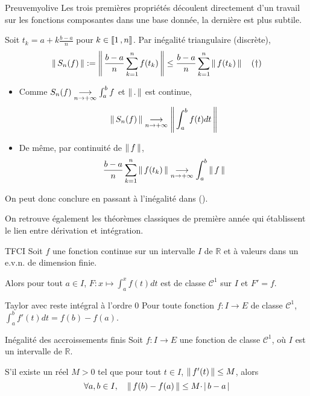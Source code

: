     \begin{demo}{Preuve}{myolive}
        Les trois premières propriétés découlent directement d’un travail sur les fonctions composantes dans une base donnée, la dernière est plus subtile. 

        Soit $t_k = a + k \frac{b-a}{n}$ pour $k \in \left\llbracket 1 \, , n \right\rrbracket$. Par inégalité triangulaire (discrète), 
        \[ \left\lVert \,S_n(f) \, \right\rVert := \left\lVert \,\frac{b-a}{n} \sum_{k=1}^{n} f(t_k) \, \right\rVert \leq \frac{b-a}{n} \sum_{k=1}^{n} \left\lVert \,f(t_k) \, \right\rVert \quad (\text{\textdagger})\]   
        \begin{itemize}
            \item Comme $S_n(f) \underset{n \rightarrow +\infty}{\longrightarrow} \int_{a}^{b} f$ et $\left\lVert \,. \, \right\rVert$ est continue, 
            \[ \left\lVert \,S_n(f) \, \right\rVert \underset{n \rightarrow +\infty}{\longrightarrow} \left\lVert \,\int_{a}^{b} f(t)dt \, \right\rVert \]   
            \item De même, par continuité de $\left\lVert \,f \, \right\rVert$, 
            \[ \frac{b-a}{n} \sum_{k=1}^{n} \left\lVert \,f(t_k) \, \right\rVert \underset{n \rightarrow +\infty}{\longrightarrow} \int_{a}^{b} \left\lVert \,f \, \right\rVert \]
        \end{itemize}
        On peut donc conclure en passant à l’inégalité dans (\textdagger).
    \end{demo}

    On retrouve également les théorèmes classiques de première année qui établissent le lien entre dérivation et intégration.

    \begin{theo}{TFCI}{}
        Soit $f$ une fonction continue sur un intervalle $I$ de $\mathbb{R}$ et à valeurs dans un e.v.n. de dimension finie.

        Alors pour tout $a \in I$, $F : x \mapsto \int_{a}^{x} f(t)dt$ est de classe $\mathcal{C}^1$ sur $I$ et $F' = f$.
    \end{theo}

    \begin{theo}{Taylor avec reste intégral à l’ordre $0$}{}
        Pour toute fonction $f : I \to E$ de classe $\mathcal{C}^1$, $\int_{a}^{b} f'(t)dt = f(b) - f(a)$.
    \end{theo}

    \begin{coro}{Inégalité des accroissements finis}{}
        Soit $f : I \to E$ une fonction de classe $\mathcal{C}^1$, où $I$ est un intervalle de $\mathbb{R}$. 

        S’il existe un réel $M > 0$ tel que pour tout $t \in I$, $\left\lVert \,f'(t) \, \right\rVert \leq M$, alors 
        \[ \forall a,b \in I, \quad \left\lVert \,f(b) - f(a) \, \right\rVert \leq M \cdotp \left\lvert \,b-a \, \right\rvert \]
    \end{coro}


